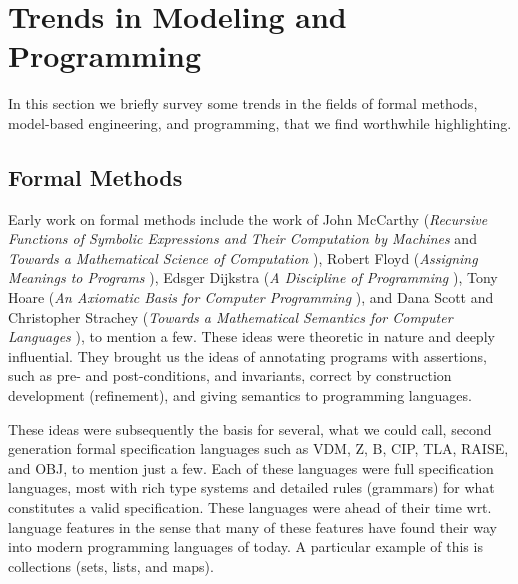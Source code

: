
\section{Trends in Modeling and Programming}
\label{sec:trends}

In this section we briefly survey some trends in the fields of
formal methods, model-based engineering, and programming, that we find worthwhile highlighting.


\subsection{Formal Methods}

Early work on formal methods include the work of John McCarthy 
({\em Recursive Functions of Symbolic Expressions and Their 
Computation by Machines} \cite{Mc60} and 
{\em Towards a Mathematical Science of Computation} \cite{Mc62a}), 
Robert Floyd ({\em Assigning Meanings to Programs} \cite{Flo67}), Edsger Dijkstra ({\em A Discipline of Programming} \cite{EWD1}), 
Tony Hoare ({\em An Axiomatic Basis for Computer Programming} \cite{Hoa69}), and Dana Scott and Christopher 
Strachey ({\em Towards a Mathematical Semantics for Computer 
Languages} \cite{Sco71}), to mention a few. These ideas were theoretic in nature and deeply influential. They brought us the ideas of  annotating programs with assertions, such as pre- and post-conditions, and invariants, correct by construction development (refinement), and giving semantics to programming languages. 

These ideas were subsequently the basis for several, what we could 
call, second generation formal specification languages such as 
VDM, Z, B, CIP, TLA, RAISE, and OBJ, to mention just a few. 
Each of these languages were full 
specification languages, most with rich type systems and detailed rules 
(grammars) for what constitutes a valid specification. These 
languages were ahead of their time wrt. language features in the 
sense that many of these features have found their 
way into modern programming languages of today. A particular
example of this is collections (sets, lists, and maps).

